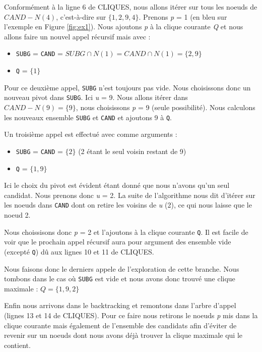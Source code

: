 \documentclass[12pt,a4paper]{article}
\begin{document}
Conformément à la ligne 6 de CLIQUES, nous allons itérer sur tous les noeuds de \(CAND - N(4)\), c'est-à-dire sur \(\{1, 2, 9, 4\}\).
Prenons \emph{p} = 1 (en bleu sur l'exemple en Figure \ref{fig:ex1}).
Nous ajoutons \emph{p} à la clique courante \emph{Q} et nous allons faire un nouvel appel récursif mais avec :
\begin{itemize}
  \item \texttt{SUBG} = \texttt{CAND} = \(SUBG \cap N(1) = CAND \cap N(1) = \{2, 9\}\)
  \item \texttt{Q} = \(\{1\}\)
\end{itemize}

Pour ce deuxième appel, \texttt{SUBG} n'est toujours pas vide. Nous choisissons donc un nouveau pivot dans \texttt{SUBG}. Ici \emph{u} = 9. Nous allons itérer dans \(CAND - N(9) = \{9\}\), nous choisissons \emph{p} = 9 (seule possibilité). Nous calculons les nouveaux ensemble \texttt{SUBG} et \texttt{CAND} et ajoutons 9 à \texttt{Q}.

Un troisième appel est effectué avec comme arguments :
\begin{itemize}
  \item \texttt{SUBG} = \texttt{CAND} = \(\{2\}\) (2 étant le seul voisin restant de 9)
  \item \texttt{Q} = \(\{1, 9\}\)
\end{itemize}

Ici le choix du pivot est évident étant donné que nous n'avons qu'un seul candidat. Nous prenons donc \emph{u} = 2. La suite de l'algorithme nous dit d'itérer sur les noeuds dans \texttt{CAND} dont on retire les voisins de \emph{u} (2), ce qui nous laisse que le noeud 2.

Nous choissisons donc \emph{p} = 2 et l'ajoutons à la clique courante \texttt{Q}.
Il est facile de voir que le prochain appel récursif aura pour argument des ensemble vide (excepté \texttt{Q}) dû aux lignes 10 et 11 de CLIQUES.

Nous faisons donc le derniers appele de l'exploration de cette branche. Nous tombons dans le cas où \texttt{SUBG} est vide et nous avons donc trouvé une clique maximale : \(Q = \{1, 9, 2\}\)

Enfin nous arrivons dans le backtracking et remontons dans l'arbre d'appel (lignes 13 et 14 de CLIQUES). Pour ce faire nous retirons le noeuds \emph{p} mis dans la clique courante mais également de l'ensemble des candidats afin d'éviter de revenir sur un noeuds dont nous avons déjà trouver la clique maximale qui le contient.
\end{document}
